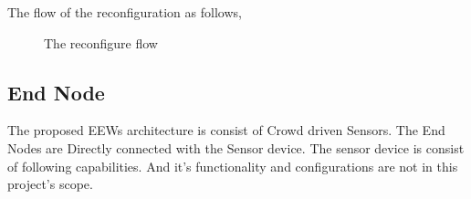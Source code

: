 \begin{table}[ht!]
\caption{Bandwidth Mapping}
\label{tab:BWmaptable}
\end{table}

\begin{table}[ht!]
\caption{Code rate mapping}
\label{tab:CRmaptable}
\end{table}


\begin{table}[ht!]
\caption{Transmission power mapping}
\label{tab:TXmaptable}
\end{table}
\newpage


The flow of the reconfiguration as follows,

\begin{figure}[ht!]
    \centering
    
    \caption{The reconfigure flow}
    \label{fig:healthck}
\end{figure}

\subsection{End Node}
The proposed \ac{EEWs} architecture is consist of Crowd driven Sensors. The End Nodes are Directly connected with the Sensor device. The sensor device is consist of following capabilities. And it's functionality and configurations are not in this project's scope.

